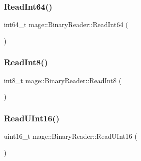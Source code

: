 \hypertarget{classmage_1_1_binary_reader_a404b0bdd39f4f1cd52cb8360896ac851}{}\label{classmage_1_1_binary_reader_a404b0bdd39f4f1cd52cb8360896ac851} 
\subsubsection{\texorpdfstring{Read\+Int64()}{ReadInt64()}}
{\footnotesize\ttfamily int64\+\_\+t mage\+::\+Binary\+Reader\+::\+Read\+Int64 (\begin{DoxyParamCaption}{ }\end{DoxyParamCaption})\hspace{0.3cm}{\ttfamily [protected]}}

\hypertarget{classmage_1_1_binary_reader_abfc9296a42190b21ad0ddb6e0ea119af}{}\label{classmage_1_1_binary_reader_abfc9296a42190b21ad0ddb6e0ea119af} 
\subsubsection{\texorpdfstring{Read\+Int8()}{ReadInt8()}}
{\footnotesize\ttfamily int8\+\_\+t mage\+::\+Binary\+Reader\+::\+Read\+Int8 (\begin{DoxyParamCaption}{ }\end{DoxyParamCaption})\hspace{0.3cm}{\ttfamily [protected]}}

\hypertarget{classmage_1_1_binary_reader_ad93616adef47e0256f117b8a6f8ba8bb}{}\label{classmage_1_1_binary_reader_ad93616adef47e0256f117b8a6f8ba8bb} 
\subsubsection{\texorpdfstring{Read\+U\+Int16()}{ReadUInt16()}}
{\footnotesize\ttfamily uint16\+\_\+t mage\+::\+Binary\+Reader\+::\+Read\+U\+Int16 (\begin{DoxyParamCaption}{ }\end{DoxyParamCaption})\hspace{0.3cm}{\ttfamily [protected]}}

